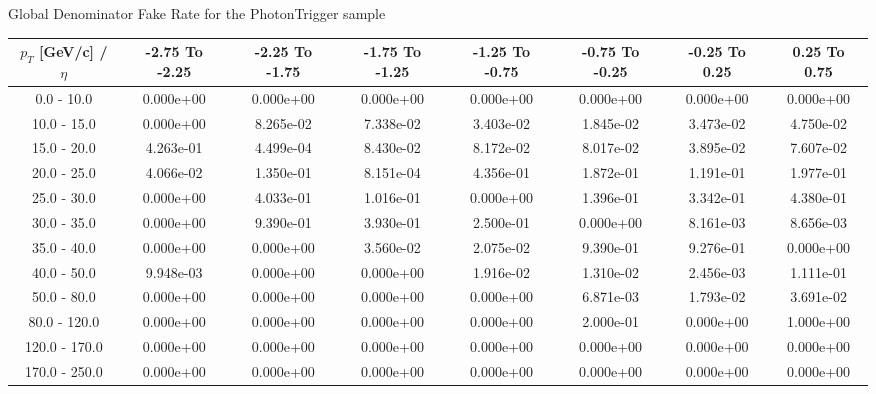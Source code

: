 \large 
Global Denominator Fake Rate for the PhotonTrigger sample
\footnotesize 
\begin{tabular*}{\textwidth}{|c|c|c|c|c|c|c|c|}\hline 
$p_T$ [GeV/c] / $\eta$  & -2.75 To -2.25 & -2.25 To -1.75 & -1.75 To -1.25 & -1.25 To -0.75 & -0.75 To -0.25 & -0.25 To 0.25 & 0.25 To 0.75 \\ 
 \hline 
0.0 - 10.0 & 0.000e+00 & 0.000e+00 & 0.000e+00 & 0.000e+00 & 0.000e+00 & 0.000e+00 & 0.000e+00 \\ 
10.0 - 15.0 & 0.000e+00 & 8.265e-02 & 7.338e-02 & 3.403e-02 & 1.845e-02 & 3.473e-02 & 4.750e-02 \\ 
15.0 - 20.0 & 4.263e-01 & 4.499e-04 & 8.430e-02 & 8.172e-02 & 8.017e-02 & 3.895e-02 & 7.607e-02 \\ 
20.0 - 25.0 & 4.066e-02 & 1.350e-01 & 8.151e-04 & 4.356e-01 & 1.872e-01 & 1.191e-01 & 1.977e-01 \\ 
25.0 - 30.0 & 0.000e+00 & 4.033e-01 & 1.016e-01 & 0.000e+00 & 1.396e-01 & 3.342e-01 & 4.380e-01 \\ 
30.0 - 35.0 & 0.000e+00 & 9.390e-01 & 3.930e-01 & 2.500e-01 & 0.000e+00 & 8.161e-03 & 8.656e-03 \\ 
35.0 - 40.0 & 0.000e+00 & 0.000e+00 & 3.560e-02 & 2.075e-02 & 9.390e-01 & 9.276e-01 & 0.000e+00 \\ 
40.0 - 50.0 & 9.948e-03 & 0.000e+00 & 0.000e+00 & 1.916e-02 & 1.310e-02 & 2.456e-03 & 1.111e-01 \\ 
50.0 - 80.0 & 0.000e+00 & 0.000e+00 & 0.000e+00 & 0.000e+00 & 6.871e-03 & 1.793e-02 & 3.691e-02 \\ 
80.0 - 120.0 & 0.000e+00 & 0.000e+00 & 0.000e+00 & 0.000e+00 & 2.000e-01 & 0.000e+00 & 1.000e+00 \\ 
120.0 - 170.0 & 0.000e+00 & 0.000e+00 & 0.000e+00 & 0.000e+00 & 0.000e+00 & 0.000e+00 & 0.000e+00 \\ 
170.0 - 250.0 & 0.000e+00 & 0.000e+00 & 0.000e+00 & 0.000e+00 & 0.000e+00 & 0.000e+00 & 0.000e+00 \\ 
 \hline 
\end{tabular*} 
